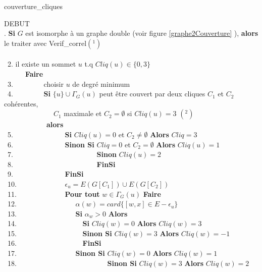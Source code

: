 \begin{algorithm}
\caption{couverture\_cliques}
\noindent DEBUT\\
. {\bf Si} $G$ est isomorphe \`a un graphe double (voir figure \ref{graphe2Couverture} ), {\bf alors} le traiter avec Verif\_correl$(^1)$ \\
~~ \\
~2.  il existe un sommet $u$ t.q $Cliq(u) \in \{0,3\}$\\ 
       	\indent~~~~~~{\bf Faire}\\
~3.	       	\indent~~~~~~~~choisir $u$ de degr\'e minimum\\
~4.       	\indent~~~~~~~~{\bf Si} $\{u\} \cup \Gamma_G(u)$ peut \^etre couvert par deux cliques $C_1$ et $C_2$ coh\'erentes,\\
		\indent~~~~~~~~~~~~~~$C_1$ maximale et $C_2 = \emptyset$ si $Cliq(u)=3$ $(^2)$\\
	       	\indent~~~~~~~~~~~~{\bf alors}\\
~5.	       	\indent~~~~~~~~~~~~~~{\bf Si } $Cliq(u) = 0$ et $C_2\neq \emptyset$ {\bf Alors} $Cliq = 3$ \\
~6.		\indent~~~~~~~~~~~~~~{\bf Sinon Si} $Cliq = 0$ et $C_2 =  \emptyset$ {\bf Alors} $Cliq(u) = 1$\\
~7.		\indent~~~~~~~~~~~~~~~~~~~~~~~{\bf Sinon} $Cliq(u) = 2$ 	\\
~8.		\indent~~~~~~~~~~~~~~~~~~~~~~~{\bf FinSi}\\      	
~9.		\indent~~~~~~~~~~~~~~{\bf FinSi}\\
~10.		\indent ~~~~~~~~~~~~~$\epsilon_u = E(G[C_1]) \cup E(G[C_2])$\\
~11.		\indent ~~~~~~~~~~~~~{\bf Pour tout} $w \in \Gamma_G(u)$ {\bf Faire} \\
~12.		\indent~~~~~~~~~~~~~~~~$\alpha(w) = card\{[w,x] \in E - \epsilon_u\}$\\
~13.		\indent~~~~~~~~~~~~~~~~{\bf Si} $\alpha_w > 0$ {\bf Alors}\\
~14.		\indent~~~~~~~~~~~~~~~~~~{\bf Si} $Cliq(w) = 0$ {\bf Alors} $Cliq(w) =3$\\
~15.		\indent~~~~~~~~~~~~~~~~~~{\bf Sinon Si} $Cliq(w) = 3$ {\bf Alors} $Cliq(w) =-1$\\
~16.		\indent~~~~~~~~~~~~~~~~~~{\bf FinSi} \\
~17.		\indent~~~~~~~~~~~~~~~~{\bf Sinon Si} $Cliq(w) = 0$ {\bf Alors} $Cliq(w) =1$\\
~18. 	\indent~~~~~~~~~~~~~~~~~~~~~~~~~{\bf Sinon Si} $Cliq(w) = 3$ {\bf Alors} $Cliq(w) = 2$ \\

\end{algorithm}

